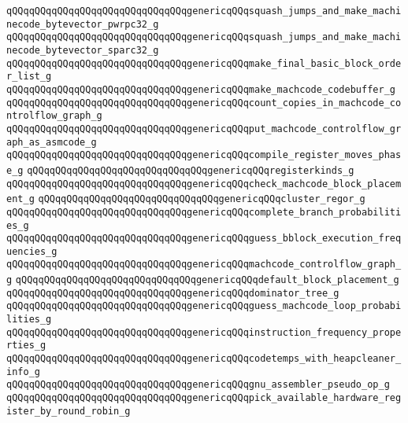 \verb|qQQqqQQqqQQqqQQqqQQqqQQqqQQqqQQqgenericqQQqsquash_jumps_and_make_machinecode_bytevector_pwrpc32_g|\newline
\verb|qQQqqQQqqQQqqQQqqQQqqQQqqQQqqQQqgenericqQQqsquash_jumps_and_make_machinecode_bytevector_sparc32_g|\newline
\verb|qQQqqQQqqQQqqQQqqQQqqQQqqQQqqQQqgenericqQQqmake_final_basic_block_order_list_g|\newline
\verb|qQQqqQQqqQQqqQQqqQQqqQQqqQQqqQQqgenericqQQqmake_machcode_codebuffer_g|\newline
\verb|qQQqqQQqqQQqqQQqqQQqqQQqqQQqqQQqgenericqQQqcount_copies_in_machcode_controlflow_graph_g|\newline
\verb|qQQqqQQqqQQqqQQqqQQqqQQqqQQqqQQqgenericqQQqput_machcode_controlflow_graph_as_asmcode_g|\newline
\verb|qQQqqQQqqQQqqQQqqQQqqQQqqQQqqQQqgenericqQQqcompile_register_moves_phase_g|\newline
\verb|qQQqqQQqqQQqqQQqqQQqqQQqqQQqqQQqgenericqQQqregisterkinds_g|\newline
\verb|qQQqqQQqqQQqqQQqqQQqqQQqqQQqqQQqgenericqQQqcheck_machcode_block_placement_g|\newline
\verb|qQQqqQQqqQQqqQQqqQQqqQQqqQQqqQQqgenericqQQqcluster_regor_g|\newline
\verb|qQQqqQQqqQQqqQQqqQQqqQQqqQQqqQQqgenericqQQqcomplete_branch_probabilities_g|\newline
\verb|qQQqqQQqqQQqqQQqqQQqqQQqqQQqqQQqgenericqQQqguess_bblock_execution_frequencies_g|\newline
\verb|qQQqqQQqqQQqqQQqqQQqqQQqqQQqqQQqgenericqQQqmachcode_controlflow_graph_g|\newline
\verb|qQQqqQQqqQQqqQQqqQQqqQQqqQQqqQQqgenericqQQqdefault_block_placement_g|\newline
\verb|qQQqqQQqqQQqqQQqqQQqqQQqqQQqqQQqgenericqQQqdominator_tree_g|\newline
\verb|qQQqqQQqqQQqqQQqqQQqqQQqqQQqqQQqgenericqQQqguess_machcode_loop_probabilities_g|\newline
\verb|qQQqqQQqqQQqqQQqqQQqqQQqqQQqqQQqgenericqQQqinstruction_frequency_properties_g|\newline
\verb|qQQqqQQqqQQqqQQqqQQqqQQqqQQqqQQqgenericqQQqcodetemps_with_heapcleaner_info_g|\newline
\verb|qQQqqQQqqQQqqQQqqQQqqQQqqQQqqQQqgenericqQQqgnu_assembler_pseudo_op_g|\newline
\verb|qQQqqQQqqQQqqQQqqQQqqQQqqQQqqQQqgenericqQQqpick_available_hardware_register_by_round_robin_g|\newline
